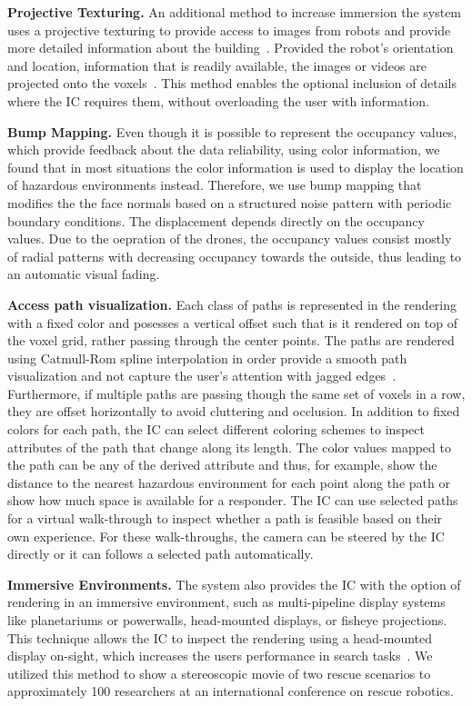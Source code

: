 \textbf{Projective Texturing. }  An additional method to increase immersion the system uses a projective texturing to provide access to images from robots and provide more detailed information about the building~\cite{everitt2001projective}.  Provided the robot's orientation and location, information that is readily available, the images or videos are projected onto the voxels~\cite{zhao2005alignment}.  This method enables the optional inclusion of details where the IC requires them, without overloading the user with information.

\textbf{Bump Mapping. }  Even though it is possible to represent the occupancy values, which provide feedback about the data reliability, using color information, we found that in most situations the color information is used to display the location of hazardous environments instead.  Therefore, we use bump mapping that modifies the the face normals based on a structured noise pattern with periodic boundary conditions.  The displacement depends directly on the occupancy values.  Due to the oepration of the drones, the occupancy values consist mostly of radial patterns with decreasing occupancy towards the outside, thus leading to an automatic visual fading.

\textbf{Access path visualization. }  Each class of paths is represented in the  rendering with a fixed color and posesses a vertical offset such that is it rendered on top of the voxel grid, rather passing through the center points.  The paths are rendered using Catmull-Rom spline interpolation in order provide a smooth path visualization and not capture the user's attention with jagged edges~\cite{catmull1974class}.  Furthermore, if multiple paths are passing though the same set of voxels in a row, they are offset horizontally to avoid cluttering and occlusion.  In addition to fixed colors for each path, the IC can select different coloring schemes to inspect attributes of the path that change along its length.  The color values mapped to the path can be any of the derived attribute and thus, for example, show the distance to the nearest hazardous environment for each point along the path or show how much space is available for a responder.  The IC can use selected paths for a virtual walk-through to inspect whether a path is feasible based on their own experience.  For these walk-throughs, the camera can be steered by the IC directly or it can follows a selected path automatically.

\textbf{Immersive Environments. }  The system also provides the IC with the option of rendering in an immersive environment, such as multi-pipeline display systems like planetariums or powerwalls, head-mounted displays, or fisheye projections.  This technique allows the IC to inspect the rendering using a head-mounted display on-sight, which increases the users performance in search tasks~\cite{pausch1997quantifying}.  We utilized this method to show a stereoscopic movie of two rescue scenarios to approximately 100 researchers at an international conference on rescue robotics.  

